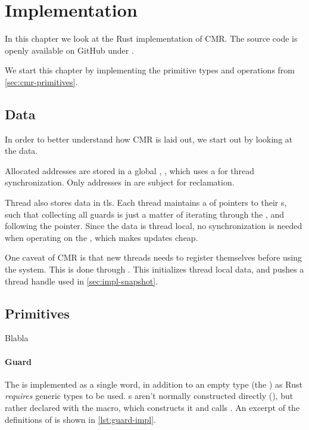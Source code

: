 \chapter{Implementation\label{ch:implementation}}

In this chapter we look at the Rust implementation of CMR\@. The source code is openly available
on GitHub under \cite{cmr-github}.

We start this chapter by implementing the primitive types and operations from
\cref{sec:cmr-primitives}.




\section{Data}

In order to better understand how CMR is laid out, we start out by looking at the data.

Allocated addresses are stored in a global , , which uses a 
for thread synchronization. Only addresses in  are subject for reclamation.


Thread also stores data in \gls{tls}. Each thread maintains a  of pointers to their
s, such that collecting all guards is just a matter of iterating through the
, and following the pointer. Since the data is thread local, no synchronization is needed
when operating on the , which makes updates cheap.

One caveat of CMR is that new threads needs to register themselves before using the system. This is
done through . This initializes thread local data, and pushes a
thread handle used in \cref{sec:impl-snapshot}.



\section{Primitives}

Blabla

\subsubsection{Guard}

The  is implemented as a single word, in addition to an empty type (the
) as Rust \emph{requires} generic types to be used. s aren't normally
constructed directly (), but rather declared with the
 macro, which constructs it and calls .
An excerpt of the definitions of  is shown in \cref{lst:guard-impl}.

